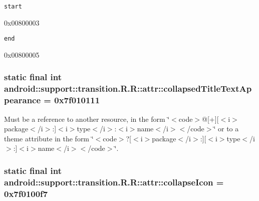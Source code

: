 {\tt start}

0x00800003

{\tt end}

0x00800005\hypertarget{classandroid_1_1support_1_1transition_1_1_r_1_1attr_34ceb92f81af9963f819eab027db2f16}{
\subsubsection[{collapsedTitleTextAppearance}]{\setlength{\rightskip}{0pt plus 5cm}static final int android::support::transition.R.R::attr::collapsedTitleTextAppearance = 0x7f010111}}
\label{classandroid_1_1support_1_1transition_1_1_r_1_1attr_34ceb92f81af9963f819eab027db2f16}


Must be a reference to another resource, in the form \char`\"{}$<$code$>$@\mbox{[}+\mbox{]}\mbox{[}$<$i$>$package$<$/i$>$:\mbox{]}$<$i$>$type$<$/i$>$:$<$i$>$name$<$/i$>$$<$/code$>$\char`\"{} or to a theme attribute in the form \char`\"{}$<$code$>$?\mbox{[}$<$i$>$package$<$/i$>$:\mbox{]}\mbox{[}$<$i$>$type$<$/i$>$:\mbox{]}$<$i$>$name$<$/i$>$$<$/code$>$\char`\"{}. \hypertarget{classandroid_1_1support_1_1transition_1_1_r_1_1attr_d03465a33ebf42892815035e5d265007}{
\subsubsection[{collapseIcon}]{\setlength{\rightskip}{0pt plus 5cm}static final int android::support::transition.R.R::attr::collapseIcon = 0x7f0100f7}}
\label{classandroid_1_1support_1_1transition_1_1_r_1_1attr_d03465a33ebf42892815035e5d265007}


